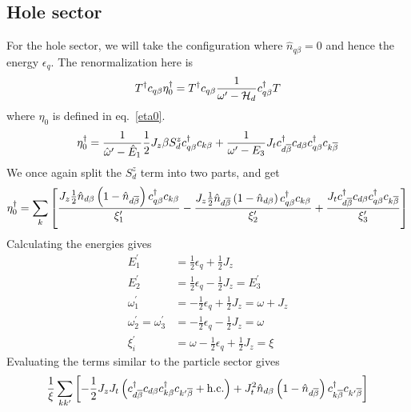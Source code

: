 \documentclass[12pt,twoside]{article}
\numberwithin{equation}{section}
\begin{document}
\subsection{Hole sector}
For the hole sector, we will take the configuration where \(\hat n_{q\beta} = 0\) and hence the energy \(\epsilon_q\). The renormalization here is
\begin{equation}\begin{aligned}
	T^\dagger c_{q\beta}\eta^\dagger_0 = T^\dagger c_{q\beta}\frac{1}{\omega^\prime - \mathcal{H}_d}c^\dagger_{q\beta} T
\end{aligned}\end{equation}
where \(\eta_0\) is defined in eq.~\ref{eta0}.
\begin{equation}\begin{aligned}
	\label{holeomega}
	\eta_0^\dagger = \frac{1}{\hat \omega^\prime - \hat E_1}\frac{1}{2}J_z \beta S_d^z c^\dagger_{q\beta}c_{k\beta} + \frac{1}{\omega^\prime - E_3}J_tc^\dagger_{d\overline\beta}c_{d\beta}c^\dagger_{q\beta}c_{k\overline\beta}
\end{aligned}\end{equation}
We once again split the \(S_d^z\) term into two parts, and get
\begin{equation}\begin{aligned}
	\eta^\dagger_0 = \sum_k \left[\frac{ J_z \frac{1}{2}\hat n_{d\beta}\left( 1 - \hat n_{d\overline\beta} \right) c^\dagger_{q\beta}c_{k\beta}}{\xi^\prime_1} - \frac{J_z \frac{1}{2}\hat n_{d\overline\beta}\left( 1 - \hat n_{d\beta} \right) c^\dagger_{q\beta}c_{k\beta}}{\xi^\prime_2} + \frac{J_t  c^\dagger_{d\overline\beta}c_{d\beta} c^\dagger_{q\beta}c_{k\overline\beta}}{\xi^\prime_3}\right] 
\end{aligned}\end{equation}
Calculating the energies gives
\begin{equation}\begin{aligned}
	E^\prime_1 &= \frac{1}{2}\epsilon_q + \frac{1}{2}J_z\\
	E^\prime_2 &= \frac{1}{2}\epsilon_q - \frac{1}{2}J_z = E^\prime_3\\
	\omega^\prime_1 &= - \frac{1}{2}\epsilon_q + \frac{1}{2}J_z = \omega + J_z\\
	\omega^\prime_2 = \omega^\prime_3 &= - \frac{1}{2}\epsilon_q - \frac{1}{2}J_z = \omega\\
	\xi_i^\prime &= \omega - \frac{1}{2}\epsilon_q + \frac{1}{2}J_z = \xi
\end{aligned}\end{equation}
Evaluating the terms similar to the particle sector gives
\begin{equation}\begin{aligned}
	\label{kondo_hole}
	\frac{1}{\xi}\sum_{kk^\prime} \left[ -\frac{1}{2} J_z J_t\left(c^\dagger_{d\overline\beta}c_{d\beta}c^\dagger_{k\beta}c_{k^\prime\overline\beta} + \text{h.c.}\right) + J_t^2 \hat n_{d\beta}\left(1 - \hat n_{d\overline\beta}\right) c^\dagger_{k\overline\beta}c_{k^\prime\overline\beta}\right]
\end{aligned}\end{equation}
\end{document}

